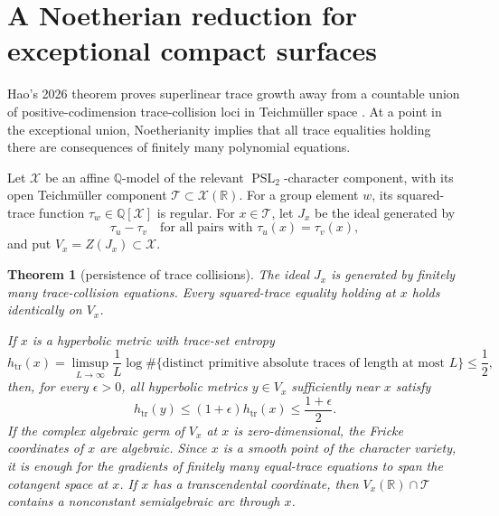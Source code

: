 \documentclass[11pt,reqno]{amsart}
\newtheorem{theorem}{Theorem}[section]
\theoremstyle{definition}
\theoremstyle{remark}
\newcommand{\R}{\mathbb R}
\newcommand{\Q}{\mathbb Q}
\newcommand{\Tr}{\operatorname{tr}}
\newcommand{\PSL}{\operatorname{PSL}}
\begin{document}
\section{A Noetherian reduction for exceptional compact surfaces}

Hao's 2026 theorem proves superlinear trace growth away from a countable union
of positive-codimension trace-collision loci in Teichm\"uller space
\cite{HaoLengthSets}.  At a point in the exceptional union, Noetherianity
implies that all trace equalities holding there are consequences of finitely
many polynomial equations.

Let \(\mathcal X\) be an affine \(\Q\)-model of the relevant
\(\PSL_2\)-character component, with its open Teichm\"uller component
\(\mathcal T\subset\mathcal X(\R)\).  For a group element \(w\), its
squared-trace function \(\tau_w\in\Q[\mathcal X]\) is regular.  For
\(x\in\mathcal T\), let \(J_x\) be the ideal generated by
\[
 \tau_u-\tau_v
 \quad\text{for all pairs with }\tau_u(x)=\tau_v(x),
\tag{13.1}
\]
and put \(V_x=Z(J_x)\subset\mathcal X\).

\begin{theorem}[persistence of trace collisions]\label{thm:noetherian}
The ideal \(J_x\) is generated by finitely many trace-collision equations.
Every squared-trace equality holding at \(x\) holds identically on \(V_x\).

If \(x\) is a hyperbolic metric with trace-set entropy
\[
 h_{\Tr}(x)=\limsup_{L\to\infty}\frac1L
 \log\#\{\text{distinct primitive absolute traces of length at most }L\}
 \le\frac12,
\tag{13.2}
\]
then, for every \(\epsilon>0\), all hyperbolic metrics \(y\in V_x\) sufficiently
near \(x\) satisfy
\[
 h_{\Tr}(y)\le(1+\epsilon)h_{\Tr}(x)\le\frac{1+\epsilon}{2}.
\tag{13.3}
\]
If the complex algebraic germ of \(V_x\) at \(x\) is zero-dimensional, the
Fricke coordinates of \(x\) are algebraic.  Since \(x\) is a smooth point of the character
variety, it is enough for the gradients of finitely many equal-trace equations
to span the cotangent space at \(x\).  If \(x\) has a transcendental
coordinate, then \(V_x(\R)\cap\mathcal T\) contains a nonconstant
semialgebraic arc through \(x\).
\end{theorem}
\end{document}
